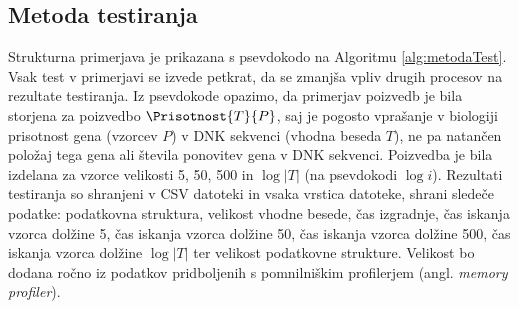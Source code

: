 \subsection{Metoda testiranja}
Strukturna primerjava je prikazana s psevdokodo na Algoritmu \ref{alg:metodaTest}. Vsak test v primerjavi se izvede petkrat, da se zmanjša vpliv drugih procesov na rezultate testiranja. Iz psevdokode opazimo, da primerjav poizvedb je bila storjena za poizvedbo $\Prisotnost{T}{P}$, saj je pogosto vprašanje v biologiji prisotnost gena (vzorcev $P$) v DNK sekvenci (vhodna beseda $T$), ne pa natančen položaj tega gena ali števila ponovitev gena v DNK sekvenci. Poizvedba je bila izdelana za vzorce velikosti 5, 50, 500 in $\log{|T|}$ (na psevdokodi $\log{i}$). Rezultati testiranja so shranjeni v CSV datoteki in vsaka vrstica datoteke, shrani sledeče podatke: podatkovna struktura, velikost vhodne besede, čas izgradnje, čas iskanja vzorca dolžine 5, čas iskanja vzorca dolžine 50, čas iskanja vzorca dolžine 500, čas iskanja vzorca dolžine $\log{|T|}$ ter velikost podatkovne strukture. Velikost bo dodana ročno iz podatkov pridboljenih s pomnilniškim profilerjem (angl. \textit{memory profiler}). 

